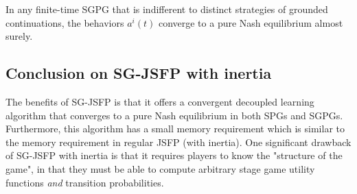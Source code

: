 \begin{thm}
In any finite-time SGPG that is indifferent to distinct strategies of grounded continuations, the behaviors $a^i(t)$ converge to a pure Nash equilibrium almost surely.
\end{thm}

\subsection{Conclusion on SG-JSFP with inertia}

The benefits of SG-JSFP is that it offers a convergent decoupled learning algorithm that converges to a pure Nash equilibrium in both SPGs and SGPGs. Furthermore, this algorithm has a small memory requirement which is similar to the memory requirement in regular JSFP (with inertia). One significant drawback of SG-JSFP with inertia is that it requires players to know the "structure of the game", in that they must be able to compute arbitrary stage game utility functions {\em and} transition probabilities. 